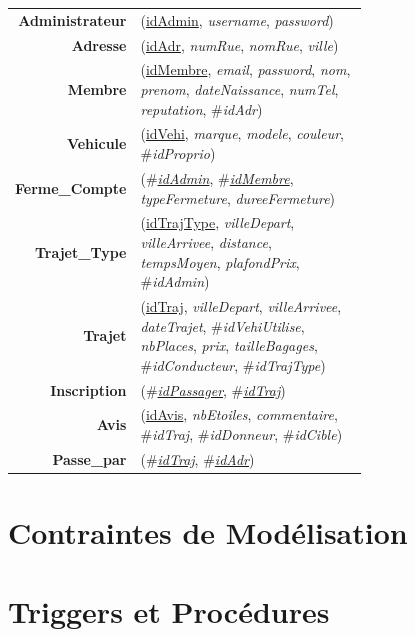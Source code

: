 \documentclass[a4paper,12pt]{article}
\newenvironment{mld}
  {\par\begin{minipage}{\linewidth}\begin{tabular}{rp{0.7\linewidth}}}
  {\end{tabular}\end{minipage}\par}
\newcommand{\attr}[1]{\emph{#1}}
\newcommand{\prim}[1]{\uline{#1}}
\newcommand{\foreign}[1]{\#\textsl{#1}}
\theoremstyle{remark}
\begin{document}
\begin{mld}
  \textbf{Administrateur} & (\prim{idAdmin}, \attr{username}, \attr{password})\\
  \textbf{Adresse} & (\prim{idAdr}, \attr{numRue}, \attr{nomRue}, \attr{ville})\\
  \textbf{Membre} & (\prim{idMembre}, \attr{email}, \attr{password}, \attr{nom}, \attr{prenom}, \attr{dateNaissance}, \attr{numTel}, \attr{reputation}, \foreign{idAdr})\\
  \textbf{Vehicule} & (\prim{idVehi}, \attr{marque}, \attr{modele}, \attr{couleur}, \foreign{idProprio})\\
  \textbf{Ferme\_Compte} & (\foreign{\prim{idAdmin}}, \foreign{\prim{idMembre}}, \attr{typeFermeture}, \attr{dureeFermeture})\\
  \textbf{Trajet\_Type} & (\prim{idTrajType}, \attr{villeDepart}, \attr{villeArrivee}, \attr{distance}, \attr{tempsMoyen}, \attr{plafondPrix}, \foreign{idAdmin})\\
  \textbf{Trajet} & (\prim{idTraj}, \attr{villeDepart}, \attr{villeArrivee}, \attr{dateTrajet}, \foreign{idVehiUtilise}, \attr{nbPlaces}, \attr{prix}, \attr{tailleBagages}, \foreign{idConducteur}, \foreign{idTrajType})\\
  \textbf{Inscription} & (\foreign{\prim{idPassager}}, \foreign{\prim{idTraj}})\\
  \textbf{Avis} & (\prim{idAvis}, \attr{nbEtoiles}, \attr{commentaire}, \foreign{idTraj}, \foreign{idDonneur}, \foreign{idCible})\\
  \textbf{Passe\_par} & (\foreign{\prim{idTraj}}, \foreign{\prim{idAdr}})\\
\end{mld}

\section*{Contraintes de Modélisation}
\label{sec:contraintes}

\section*{Triggers et Procédures}
\label{sec:triggers}
\end{document}

